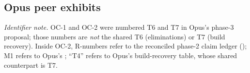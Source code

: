 




\subsection*{Opus peer exhibits}

\textit{Identifier note.} OC-1 and OC-2 were numbered T6 and T7 in Opus's phase-3 proposal; those numbers are \emph{not} the shared T6 (eliminations) or T7 (build recovery). Inside OC-2, R-numbers refer to the reconciled phase-2 claim ledger (); M1 refers to Opus's ; ``T4'' refers to Opus's  build-recovery table, whose shared counterpart is T7.

